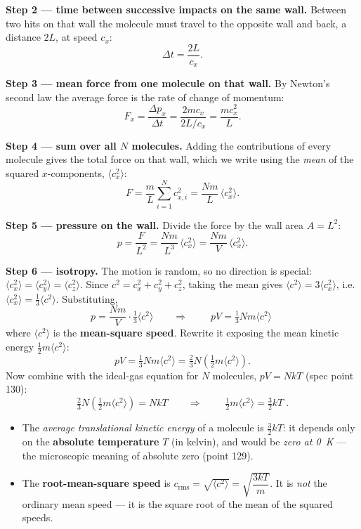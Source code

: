 \documentclass[11pt,a4paper]{article}
\begin{document}
\textbf{Step 2 --- time between successive impacts on the same wall.} Between two hits on
that wall the molecule must travel to the opposite wall and back, a distance $2L$, at speed
$c_x$:
\[
\Delta t = \frac{2L}{c_x}.
\]

\textbf{Step 3 --- mean force from one molecule on that wall.} By Newton's second law the
average force is the rate of change of momentum:
\[
F_x = \frac{\Delta p_x}{\Delta t} = \frac{2 m c_x}{2L / c_x} = \frac{m c_x^{2}}{L}.
\]

\textbf{Step 4 --- sum over all $N$ molecules.} Adding the contributions of every molecule
gives the total force on that wall, which we write using the \emph{mean} of the squared
$x$-components, $\langle c_x^2\rangle$:
\[
F = \frac{m}{L}\sum_{i=1}^{N} c_{x,i}^{2} = \frac{N m}{L}\,\langle c_x^{2}\rangle .
\]

\textbf{Step 5 --- pressure on the wall.} Divide the force by the wall area $A = L^2$:
\[
p = \frac{F}{L^{2}} = \frac{N m}{L^{3}}\,\langle c_x^{2}\rangle
  = \frac{N m}{V}\,\langle c_x^{2}\rangle .
\]

\textbf{Step 6 --- isotropy.} The motion is random, so no direction is special:
$\langle c_x^2\rangle = \langle c_y^2\rangle = \langle c_z^2\rangle$. Since
$c^2 = c_x^2 + c_y^2 + c_z^2$, taking the mean gives $\langle c^2\rangle = 3\langle
c_x^2\rangle$, i.e. $\langle c_x^2\rangle = \tfrac13\langle c^2\rangle$. Substituting,
\[
p = \frac{N m}{V}\cdot\tfrac13\langle c^2\rangle
\qquad\Longrightarrow\qquad
\boxed{\;pV = \tfrac{1}{3}N m \langle c^2\rangle\;}
\]
where $\langle c^2\rangle$ is the \textbf{mean-square speed}. Rewrite it exposing the mean
kinetic energy $\tfrac12 m\langle c^2\rangle$:
\[
pV = \tfrac{1}{3}N m \langle c^2\rangle = \tfrac{2}{3}N\left(\tfrac{1}{2}m\langle c^2\rangle\right).
\]
Now combine with the ideal-gas equation for $N$ molecules, $pV = NkT$ (spec point 130):
\[
\tfrac{2}{3}N\left(\tfrac{1}{2}m\langle c^2\rangle\right) = NkT
\qquad\Longrightarrow\qquad
\boxed{\;\tfrac{1}{2}m\langle c^2\rangle = \tfrac{3}{2}kT\;}.
\]

\begin{keybox}
\begin{itemize}[leftmargin=1.4em,itemsep=1pt]
  \item The \emph{average translational kinetic energy} of a molecule is $\tfrac32 kT$: it
        depends only on the \textbf{absolute temperature} $T$ (in kelvin), and would be
        \emph{zero at \SI{0}{K}} --- the microscopic meaning of absolute zero (point 129).
  \item The \textbf{root-mean-square speed} is $c_{\mathrm{rms}} = \sqrt{\langle c^2\rangle}
        = \sqrt{\dfrac{3kT}{m}}$. It is \emph{not} the ordinary mean speed --- it is the
        square root of the mean of the squared speeds.
\end{itemize}
\end{keybox}
\end{document}
